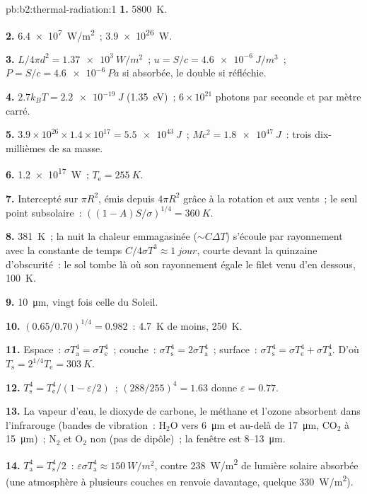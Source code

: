\begin{solution}{pb:b2:thermal-radiation:1}
\textbf{1.} \qty{5800}{K}.

\textbf{2.} \qty{6.4e7}{W/m^2}~; \qty{3.9e26}{W}.

\textbf{3.} $L/4\pi d^2 = \qty{1.37e3}{W/m^2}$~; $u = S/c = \qty{4.6e-6}{J/m^3}$~;
$P = S/c = \qty{4.6e-6}{Pa}$ si absorbée, le double si réfléchie.

\textbf{4.} $2.7k_BT = \qty{2.2e-19}{J}$ (\qty{1.35}{eV})~; $6 \times 10^{21}$
photons par seconde et par mètre carré.

\textbf{5.} $3.9 \times 10^{26} \times 1.4 \times 10^{17} = \qty{5.5e43}{J}$~; $Mc^2 =
\qty{1.8e47}{J}$~: trois dix-millièmes de sa masse.

\textbf{6.} \qty{1.2e17}{W}~; $T_{\text{e}} = \qty{255}{K}$.

\textbf{7.} Intercepté sur $\pi R^2$, émis depuis $4\pi R^2$ grâce à la
rotation et aux vents~; le seul point subsolaire~: $((1 - A)S/\sigma)^{1/4} =
\qty{360}{K}$.

\textbf{8.} \qty{381}{K}~; la nuit la chaleur emmagasinée ($\sim C\Delta T$) s'écoule par
rayonnement avec la constante de temps $C/4\sigma T^3 \approx \qty{1}{jour}$, courte
devant la quinzaine d'obscurité~: le sol tombe là où son
rayonnement égale le filet venu d'en dessous, \qty{100}{K}.

\textbf{9.} \qty{10}{\micro m}, vingt fois celle du Soleil.

\textbf{10.} $(0.65/0.70)^{1/4} = 0.982$~: \qty{4.7}{K} de moins, \qty{250}{K}.

\textbf{11.} Espace~: $\sigma T_{\text{a}}^4 = \sigma T_{\text{e}}^4$~; couche~: $\sigma
T_{\text{s}}^4 = 2\sigma T_{\text{a}}^4$~; surface~: $\sigma T_{\text{s}}^4 = \sigma
T_{\text{e}}^4 + \sigma T_{\text{a}}^4$. D'où $T_{\text{s}} = 2^{1/4}T_{\text{e}} = \qty{303}{K}$.

\textbf{12.} $T_{\text{s}}^4 = T_{\text{e}}^4/(1 - \varepsilon/2)$~; $(288/255)^4 = 1.63$
donne $\varepsilon = 0.77$.

\textbf{13.} La vapeur d'eau, le dioxyde de carbone, le méthane et l'ozone absorbent dans
l'infrarouge (bandes de vibration~: H$_2$O vers \qty{6}{\micro m} et au-delà de
\qty{17}{\micro m}, CO$_2$ à \qty{15}{\micro m})~; N$_2$ et O$_2$ non (pas de
dipôle)~; la fenêtre est \qty{8}{}--\qty{13}{\micro m}.

\textbf{14.} $T_{\text{a}}^4 = T_{\text{s}}^4/2$~: $\varepsilon\sigma T_{\text{a}}^4 \approx
\qty{150}{W/m^2}$, contre \qty{238}{W/m^2} de lumière solaire absorbée (une
atmosphère à plusieurs couches en renvoie davantage, quelque \qty{330}{W/m^2}).


\end{solution}
